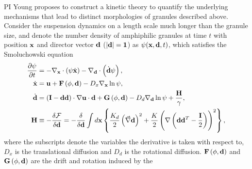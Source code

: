 %
PI Young proposes to construct a kinetic theory to quantify the underlying mechanisms that lead to distinct morphologies of granules described above.
Consider the suspension dynamics on a length scale much longer than the granule size, and denote the number density of 
amphiphilic granules at time $t$ with position ${\bf x}$ and director vector ${\bf d}$ ($|\bf d|=1$) as $\psi({\bf x}, {\bf d},t)$, which satisfies the 
Smoluchowski equation 
\begin{align}
\frac{\partial \psi}{\partial t} &= -\nabla_{\bf x} \cdot\left(\psi\dot{\bf x}\right) - \nabla_{\bf d}\cdot\left(\dot{\bf d}\psi\right),\\
\dot{\bf x} &= {\bf u} + {\bf F}\left(\phi,{\bf d}\right) - D_x\nabla_{\bf x}\ln\psi,\\
\label{eq:dpdt}
\dot{\bf d} &= \left({\bf I}-{\bf d}{\bf d}\right)\cdot\nabla {\bf u}\cdot {\bf d} + {\bf G}\left(\phi,{\bf d}\right) - D_d \nabla_{\bf d}\ln \psi + \frac{{\bf H}}{\gamma},\\
{\bf H} &\equiv -\frac{\delta {\cal F}}{\delta {\bf d}} = -\frac{\delta}{\delta {\bf d}} 
\int d{\bf x} \left\{\frac{K_d}{2} \left(\vec\nabla{\bf d}\right)^2 + \frac{K}{2}\left(\nabla\left({\bf d}{\bf d}^T- \frac{\bf I}{2}\right)\right)^2\right\},
\end{align}
where the subscripts denote the variables the derivative is taken with
respect to, $D_x$ is the translational diffusion and $D_d$ is the
rotational diffusion. ${\bf F}\left(\phi,{\bf d}\right)$ and ${\bf
G}\left(\phi,{\bf d}\right)$ are the drift and rotation induced by the
